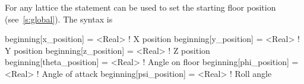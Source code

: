 For any lattice the  statement can be used to set the starting floor position 
(see~\ref{s:global}). The syntax is
\begin{example}
  beginning[x_position]     = <Real>  ! X position
  beginning[y_position]     = <Real>  ! Y position
  beginning[z_position]     = <Real>  ! Z position
  beginning[theta_position] = <Real>  ! Angle on floor
  beginning[phi_position]   = <Real>  ! Angle of attack
  beginning[psi_position]   = <Real>  ! Roll angle
\end{example}

